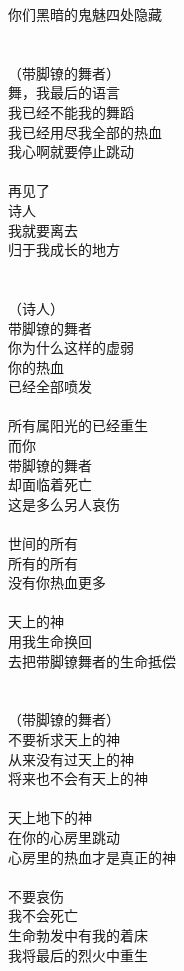 你们黑暗的鬼魅四处隐藏\\
\\
\\
（带脚镣的舞者）\\
舞，我最后的语言\\
我已经不能我的舞蹈\\
我已经用尽我全部的热血\\
我心啊就要停止跳动\\
\\
再见了\\
诗人\\
我就要离去\\
归于我成长的地方\\
\\
\\
（诗人）\\
带脚镣的舞者\\
你为什么这样的虚弱\\
你的热血\\
已经全部喷发\\
\\
所有属阳光的已经重生\\
而你\\
带脚镣的舞者\\
却面临着死亡\\
这是多么另人哀伤\\
\\
世间的所有\\
所有的所有\\
没有你热血更多\\
\\
天上的神\\
用我生命换回\\
去把带脚镣舞者的生命抵偿\\
\\
\\
（带脚镣的舞者）\\
不要祈求天上的神\\
从来没有过天上的神\\
将来也不会有天上的神\\
\\
天上地下的神\\
在你的心房里跳动\\
心房里的热血才是真正的神\\
\\
不要哀伤\\
我不会死亡\\
生命勃发中有我的着床\\
我将最后的烈火中重生\\
